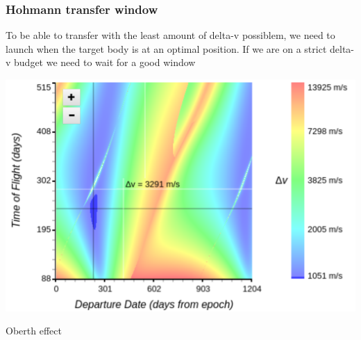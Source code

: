 \begin{frame}
    \frametitle{Hohmann transfer window}
    \begin{block}{}
        To be able to transfer with the least amount of delta-v possiblem, we need to launch when the target body is
        at an optimal position. If we are on a strict delta-v budget we need to wait for a good window
    \end{block}
    \begin{block}{}
        \begin{center}
            \includegraphics[scale=0.08]{images/hohmann_transfer_window}
        \end{center}
    \end{block}
\end{frame}
{
%
\begin{frame}[t]{Oberth effect}
\end{frame}
}
